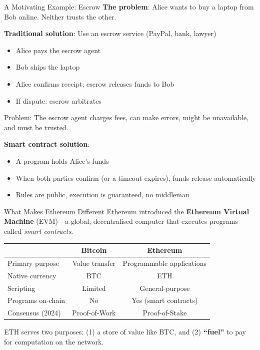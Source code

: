 \documentclass[10pt]{beamer}
\newcommand{\highlight}[1]{\textcolor{AccentOrange}{\textbf{#1}}}
\newcommand{\bad}[1]{\textcolor{AccentOrange}{#1}}
\begin{document}
\begin{frame}{A Motivating Example: Escrow}
  \textbf{The problem}: Alice wants to buy a laptop from Bob online. Neither trusts the other.
  
  \vspace{1em}
  \textbf{Traditional solution}: Use an escrow service (PayPal, bank, lawyer)
  \begin{itemize}
    \item Alice pays the escrow agent
    \item Bob ships the laptop
    \item Alice confirms receipt; escrow releases funds to Bob
    \item If dispute: escrow arbitrates
  \end{itemize}
  
  \vspace{0.5em}
  \bad{Problem}: The escrow agent charges fees, can make errors, might be unavailable, and must be trusted.
  
  \vspace{1em}
  \textbf{Smart contract solution}:
  \begin{itemize}
    \item A program holds Alice's funds
    \item When both parties confirm (or a timeout expires), funds release automatically
    \item Rules are public, execution is guaranteed, no middleman
  \end{itemize}
\end{frame}

\begin{frame}{What Makes Ethereum Different}
  Ethereum introduced the \highlight{Ethereum Virtual Machine} (EVM)---a global, decentralised computer that executes programs called \textit{smart contracts}.
  
  \vspace{1em}
  \begin{center}
  \begin{tabular}{lcc}
    \toprule
    & \textbf{Bitcoin} & \textbf{Ethereum} \\
    \midrule
    Primary purpose & Value transfer & Programmable applications \\
    Native currency & BTC & ETH \\
    Scripting & Limited & General-purpose \\
    Programs on-chain & No & Yes (smart contracts) \\
    Consensus (2024) & Proof-of-Work & Proof-of-Stake \\
    \bottomrule
  \end{tabular}
  \end{center}
  
  \vspace{1em}
  ETH serves two purposes: (1) a store of value like BTC, and (2) \highlight{``fuel''} to pay for computation on the network.
\end{frame}
\end{document}
